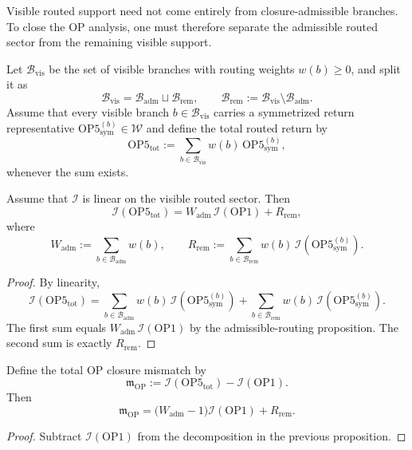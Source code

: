 Visible routed support need not come entirely from closure-admissible branches. To close the OP analysis, one must therefore separate the admissible routed sector from the remaining visible support.

Let $\mathcal{B}_{\mathrm{vis}}$ be the set of visible branches with routing weights $w(b)\ge 0$, and split it as
\[
\mathcal{B}_{\mathrm{vis}}
=
\mathcal{B}_{\mathrm{adm}}\sqcup\mathcal{B}_{\mathrm{rem}},
\qquad
\mathcal{B}_{\mathrm{rem}}:=\mathcal{B}_{\mathrm{vis}}\setminus\mathcal{B}_{\mathrm{adm}}.
\]
Assume that every visible branch $b\in\mathcal{B}_{\mathrm{vis}}$ carries a symmetrized return representative $\mathrm{OP5}^{(b)}_{\mathrm{sym}}\in\mathcal{W}$ and define the total routed return by
\[
\mathrm{OP5}_{\mathrm{tot}}
:=
\sum_{b\in\mathcal{B}_{\mathrm{vis}}} w(b)\,\mathrm{OP5}^{(b)}_{\mathrm{sym}},
\]
whenever the sum exists.

\begin{proposition}
Assume that $\mathcal{I}$ is linear on the visible routed sector. Then
\[
\mathcal{I}(\mathrm{OP5}_{\mathrm{tot}})
=
W_{\mathrm{adm}}\,\mathcal{I}(\mathrm{OP1}) + R_{\mathrm{rem}},
\]
where
\[
W_{\mathrm{adm}}:=\sum_{b\in\mathcal{B}_{\mathrm{adm}}} w(b),
\qquad
R_{\mathrm{rem}}:=\sum_{b\in\mathcal{B}_{\mathrm{rem}}} w(b)\,\mathcal{I}\!\left(\mathrm{OP5}^{(b)}_{\mathrm{sym}}\right).
\]
\end{proposition}

\begin{proof}
By linearity,
\[
\mathcal{I}(\mathrm{OP5}_{\mathrm{tot}})
=
\sum_{b\in\mathcal{B}_{\mathrm{adm}}} w(b)\,\mathcal{I}\!\left(\mathrm{OP5}^{(b)}_{\mathrm{sym}}\right)
+
\sum_{b\in\mathcal{B}_{\mathrm{rem}}} w(b)\,\mathcal{I}\!\left(\mathrm{OP5}^{(b)}_{\mathrm{sym}}\right).
\]
The first sum equals $W_{\mathrm{adm}}\,\mathcal{I}(\mathrm{OP1})$ by the admissible-routing proposition. The second sum is exactly $R_{\mathrm{rem}}$.
\end{proof}

\begin{corollary}
Define the total OP closure mismatch by
\[
\mathfrak{m}_{\mathrm{OP}}
:=
\mathcal{I}(\mathrm{OP5}_{\mathrm{tot}})-\mathcal{I}(\mathrm{OP1}).
\]
Then
\[
\mathfrak{m}_{\mathrm{OP}}
=
\bigl(W_{\mathrm{adm}}-1\bigr)\mathcal{I}(\mathrm{OP1}) + R_{\mathrm{rem}}.
\]
\end{corollary}

\begin{proof}
Subtract $\mathcal{I}(\mathrm{OP1})$ from the decomposition in the previous proposition.
\end{proof}

